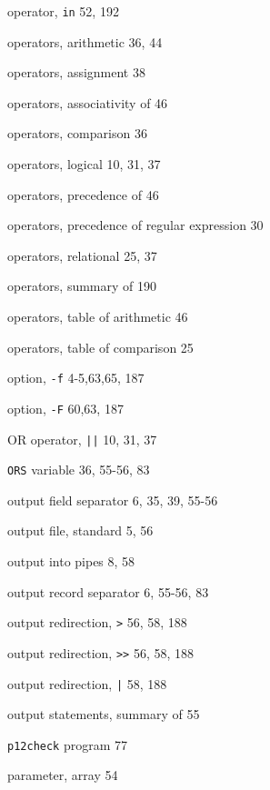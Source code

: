\begin{multicols}{3}
\hangindent=3pc  operator, \verb'in' 52, 192

\hangindent=3pc  operators, arithmetic 36, 44

\hangindent=3pc  operators, assignment 38

\hangindent=3pc  operators, associativity of 46

\hangindent=3pc  operators, comparison 36

\hangindent=3pc  operators, logical 10, 31, 37

\hangindent=3pc  operators, precedence of 46

\hangindent=3pc  operators, precedence of regular expression 30

\hangindent=3pc  operators, relational 25, 37

\hangindent=3pc  operators, summary of 190

\hangindent=3pc  operators, table of arithmetic 46

\hangindent=3pc  operators, table of comparison 25

\hangindent=3pc  option, \verb'-f' 4-5,63,65, 187

\hangindent=3pc  option, \verb'-F' 60,63, 187

\hangindent=3pc  OR operator, \verb'||' 10, 31, 37

\hangindent=3pc  \verb'ORS' variable 36, 55-56, 83

\hangindent=3pc  output field separator 6, 35, 39, 55-56

\hangindent=3pc  output file, standard 5, 56

\hangindent=3pc  output into pipes 8, 58

\hangindent=3pc  output record separator 6, 55-56,  83

\hangindent=3pc  output redirection, \verb'>' 56, 58, 188

\hangindent=3pc  output redirection, \verb'>>' 56, 58, 188

\hangindent=3pc  output redirection, \verb'|' 58, 188

\hangindent=3pc  output statements, summary of 55

\hangindent=3pc  \verb'p12check' program 77

\hangindent=3pc  parameter, array 54


\end{multicols}
